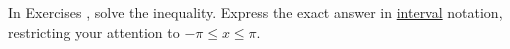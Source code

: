 {\noindent In Exercises}
{, solve the inequality.  Express the exact answer in \underline{interval} notation, restricting your attention to $-\pi \leq x \leq \pi$.}
